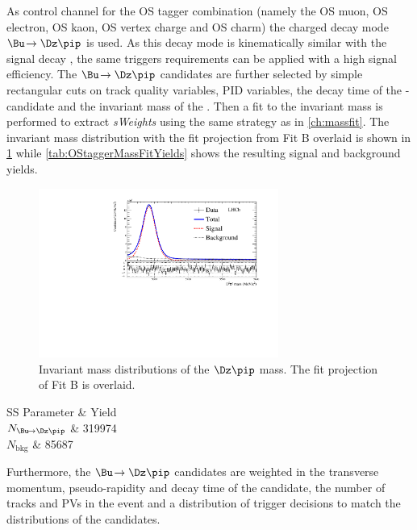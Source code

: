 As control channel for the OS tagger combination (namely the OS muon, OS electron, OS kaon, OS vertex charge and OS charm) the charged decay mode $\Bu\!\to\Dz\pip$ is used.
As this decay mode is kinematically  similar with the signal decay \BdToDpi, the same triggers requirements can be applied with a high signal efficiency.
The $\Bu\!\to\Dz\pip$ candidates are further selected by simple rectangular cuts on track quality variables, PID variables, the decay time of the \B-candidate and the invariant mass of the \Dz.
Then a fit to the invariant \Bu mass is performed to extract \emph{sWeights} using the same strategy as in \cref{ch:massfit}.
The invariant mass distribution with the fit projection from Fit B overlaid is shown in \cref{fig:OStaggerMassFit} while \cref{tab:OStaggerMassFitYields} shows the resulting signal and background yields.
\begin{figure}[tbp]
	\begin{center}
		\includegraphics[width=0.7\textwidth]{08FlavourTagging/figs/MDFitForSWeights_BeautyMass_Bu2D0Pi.pdf}
	\end{center}
	\caption{Invariant mass distributions of the $\Dz\pip$ mass.
    The fit projection of Fit B is overlaid.}
	\label{fig:OStaggerMassFit}
\end{figure}
\begin{table}
	\begin{center}
	\caption{Fitted yields of the $\Bu\!\to\Dz\pip$ control channel from Fit B.}
	\begin{tabular}{SS}
		\toprule
		{Parameter} & {Yield} \\
		\midrule
		{$N_{\Bu\!\to\Dz\pip}$}	& 319974 \\
		{$N_{\text{bkg}}$}		& 85687 \\
		\bottomrule
	\end{tabular}
	\label{tab:OStaggerMassFitYields}
  \end{center}
\end{table}
Furthermore, the $\Bu\!\to\Dz\pip$ candidates are weighted in the transverse momentum, pseudo-rapidity and decay time of the \B candidate, the number of tracks and PVs in the event and a distribution of trigger decisions to match the distributions of the \BdToDpi candidates.

